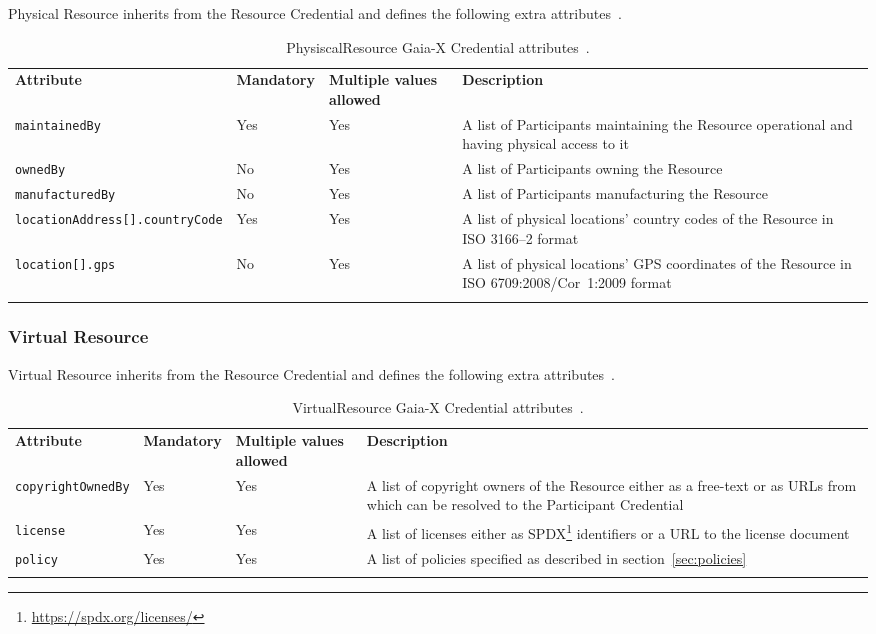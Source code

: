 Physical Resource inherits from the Resource Credential and defines the following extra attributes~\cite{gaiax_trust_framework}.

\begin{longtable}{ |p{4cm}|p{2cm}|p{2cm}|p{7cm}| }
    \hhline{----}
    \textbf{Attribute} & \textbf{Mandatory} & \textbf{Multiple values allowed} & \textbf{Description}\\
    \hhline{----}
    \texttt{maintainedBy} & Yes & Yes & A list of Participants maintaining the Resource operational and having physical access to it\\
    \hhline{----}
    \texttt{ownedBy} & No & Yes & A list of Participants owning the Resource\\
    \hhline{----}
    \texttt{manufacturedBy} & No & Yes & A list of Participants manufacturing the Resource\\
    \hhline{----}
    \texttt{locationAddress[].countryCode} & Yes & Yes & A list of physical locations' country codes of the Resource in ISO 3166--2 format\\
    \hhline{----}
    \texttt{location[].gps} & No & Yes & A list of physical locations' GPS coordinates of the Resource in ISO 6709:2008/Cor~1:2009 format\\
    \hhline{----}
    \caption{PhysiscalResource Gaia-X Credential attributes~\cite{gaiax_trust_framework}.}
    \label{tab:physical_resource}
\end{longtable}

\subsubsection{Virtual Resource}

Virtual Resource inherits from the Resource Credential and defines the following extra attributes~\cite{gaiax_trust_framework}.

\begin{longtable}{ |p{4cm}|p{2cm}|p{2cm}|p{7cm}| }
    \hhline{----}
    \textbf{Attribute} & \textbf{Mandatory} & \textbf{Multiple values allowed} & \textbf{Description}\\
    \hhline{----}
    \texttt{copyrightOwnedBy} & Yes & Yes & A list of copyright owners of the Resource either as a free-text or as URLs from which can be resolved to the Participant Credential\\
    \hhline{----}
    \texttt{license} & Yes & Yes & A list of licenses either as SPDX\footnote{\url{https://spdx.org/licenses/}} identifiers or a URL to the license document\\
    \hhline{----}
    \texttt{policy} & Yes & Yes & A list of policies specified as described in section~\ref{sec:policies}\\
    \hhline{----}
    \caption{VirtualResource Gaia-X Credential attributes~\cite{gaiax_trust_framework}.}
    \label{tab:virtual_resource}
\end{longtable}

